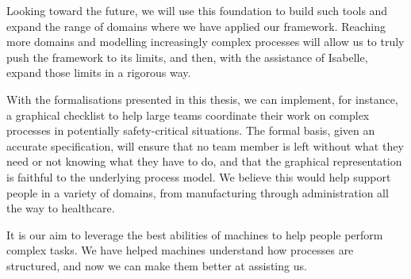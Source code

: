 \documentclass[class=smolathesis,crop=false]{standalone}
\begin{document}
Looking toward the future, we will use this foundation to build such tools and expand the range of domains where we have applied our framework.
Reaching more domains and modelling increasingly complex processes will allow us to truly push the framework to its limits, and then, with the assistance of Isabelle, expand those limits in a rigorous way.

With the formalisations presented in this thesis, we can implement, for instance, a graphical checklist to help large teams coordinate their work on complex processes in potentially safety-critical situations.
The formal basis, given an accurate specification, will ensure that no team member is left without what they need or not knowing what they have to do, and that the graphical representation is faithful to the underlying process model.
We believe this would help support people in a variety of domains, from manufacturing through administration all the way to healthcare.

It is our aim to leverage the best abilities of machines to help people perform complex tasks.
We have helped machines understand how processes are structured, and now we can make them better at assisting us.

\ifstandalone


\fi
\end{document}

